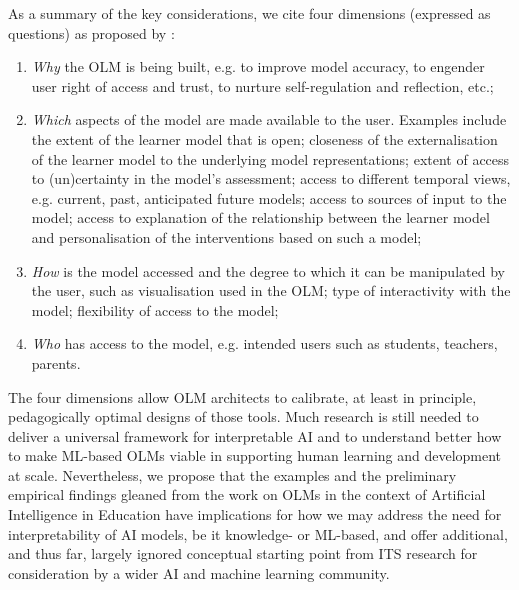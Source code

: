 \documentclass{article}
\begin{document}
As a summary of the key considerations, we cite four dimensions (expressed as questions) as proposed by \cite{Bull2016}:
\begin{enumerate}
\item \emph{Why} the OLM is being built, e.g. to improve model accuracy, to engender user right of access and trust, to nurture self-regulation and reflection, etc.;
\item \emph{Which} aspects of the model are made available to the user. Examples include the extent of the learner model that is open; closeness of the externalisation of the learner model to the underlying model representations; extent of access to (un)certainty in the model's assessment; access to different temporal views, e.g. current, past, anticipated future models; access to sources of input to the model; access to explanation of the relationship between the learner model and personalisation of the interventions based on such a model;
\item \emph{How} is the model accessed and the degree to which it can be manipulated by the user, such as visualisation used in the OLM; type of interactivity with the model; flexibility of access to the model;
\item \emph{Who} has access to the model, e.g. intended users such as students, teachers, parents.  
\end{enumerate}

The four dimensions allow OLM architects to calibrate, at least in principle, pedagogically optimal designs of those tools. Much research is still needed to deliver a universal framework for interpretable AI and to understand better how to make ML-based OLMs viable in supporting human learning and development at scale. Nevertheless, we propose that the examples and the preliminary empirical findings gleaned from the work on OLMs in the context of Artificial Intelligence in Education have implications for how we may address the need for interpretability of AI models, be it knowledge- or ML-based, and offer additional, and thus far, largely ignored conceptual starting point from ITS research for consideration by a wider AI and machine learning community.



\end{document}
